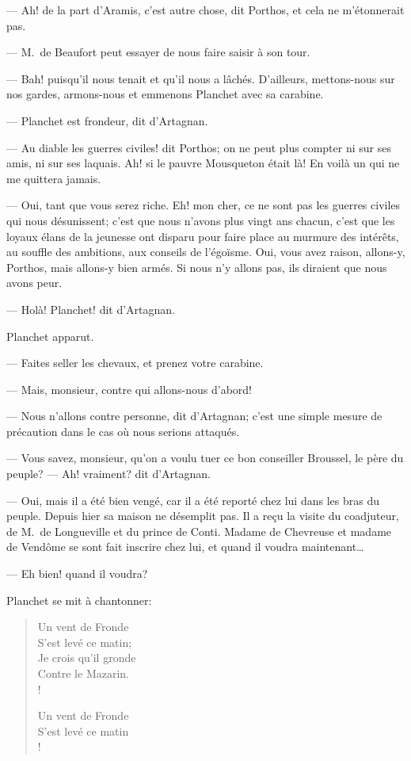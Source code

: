 — Ah! de la part d'Aramis, c'est autre chose, dit Porthos, et cela ne m'étonnerait pas.

— M.~de Beaufort peut essayer de nous faire saisir à son tour.

— Bah! puisqu'il nous tenait et qu'il nous a lâchés. D'ailleurs, mettons-nous sur nos gardes, armons-nous et emmenons Planchet avec sa carabine.

— Planchet est frondeur, dit d'Artagnan.

— Au diable les guerres civiles! dit Porthos; on ne peut plus compter ni sur ses amis, ni sur ses laquais. Ah! si le pauvre Mousqueton était là! En voilà un qui ne me quittera jamais.

— Oui, tant que vous serez riche. Eh! mon cher, ce ne sont pas les guerres civiles qui nous désunissent; c'est que nous n'avons plus vingt ans chacun, c'est que les loyaux élans de la jeunesse ont disparu pour faire place au murmure des intérêts, au souffle des ambitions, aux conseils de l'égoïsme. Oui, vous avez raison, allons-y, Porthos, mais allons-y bien armés. Si nous n'y allons pas, ils diraient que nous avons peur.

— Holà! Planchet! dit d'Artagnan.

Planchet apparut.

— Faites seller les chevaux, et prenez votre carabine.

— Mais, monsieur, contre qui allons-nous d'abord!

— Nous n'allons contre personne, dit d'Artagnan; c'est une simple mesure de précaution dans le cas où nous serions attaqués.

— Vous savez, monsieur, qu'on a voulu tuer ce bon conseiller Broussel, le père du peuple?
— Ah! vraiment? dit d'Artagnan.

— Oui, mais il a été bien vengé, car il a été reporté chez lui dans les bras du peuple. Depuis hier sa maison ne désemplit pas. Il a reçu la visite du coadjuteur, de M.~de Longueville et du prince de Conti. Madame de Chevreuse et madame de Vendôme se sont fait inscrire chez lui, et quand il voudra maintenant\dots

— Eh bien! quand il voudra?

Planchet se mit à chantonner:

\begin{verse}\itshape
	\begin{altverse}
Un vent de Fronde\\
S'est levé ce matin;\\
Je crois qu'il gronde\\
Contre le Mazarin.\\!

Un vent de Fronde\\
S'est levé ce matin\\!
\end{altverse}
\end{verse}


